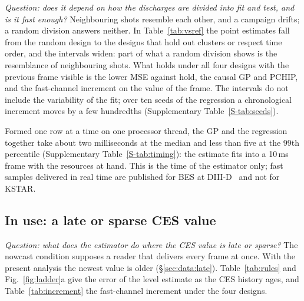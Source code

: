 \documentclass[11pt,a4paper]{article}
\newcommand{\SuppTab}[1]{Supplementary Table~\ref{S-#1}}
\begin{document}
\emph{Question: does it depend on how the discharges are divided into fit and test, and
is it fast enough?} Neighbouring shots resemble each other, and a campaign drifts; a
random division answers neither. In Table~\ref{tab:vsref} the point estimates fall from
the random design to the designs that hold out clusters or respect time order, and the
intervals widen: part of what a random division shows is the resemblance of neighbouring
shots. What holds under all four designs with the previous frame visible is the lower MSE
against hold, the causal GP and PCHIP, and the fast-channel increment on the value of the
frame. The intervals do not include the variability of the fit; over ten seeds of the
regression a chronological increment moves by a few hundredths (\SuppTab{tab:seeds}).

Formed one row at a time on one processor thread, the GP and the regression together take
about two milliseconds at the median and less than five at the 99th percentile
(\SuppTab{tab:timing}): the estimate fits into a 10\,ms frame with the resources at
hand. This is the time of the estimator only; fast samples delivered in real time are
published for BES at DIII-D~\citep{Kim2026RealTimePlasma} and not for KSTAR.

\subsection{In use: a late or sparse CES value}
\label{sec:res:use}

\emph{Question: what does the estimator do where the CES value is late or sparse?} The
nowcast condition supposes a reader that delivers every frame at once. With the present
analysis the newest value is older (\S\ref{sec:data:late}). Table~\ref{tab:rules} and
Fig.~\ref{fig:ladder}a give the error of the level estimate as the CES history ages, and
Table~\ref{tab:increment} the fast-channel increment under the four designs.

\begin{table}[tbp]
  \centering
  \caption{The estimator in use: error of the level estimate by availability rule, KSTAR,
  random design V1, target L5. Upper block: fixed delays on the rows complete under all
  of them (\NCommonRows{} rows, \NCommonDischarges{} discharges, \NCommonClusters{}
  clusters). Lower block: the beam-modulation schedule S, with an analysis time of zero,
  and the previous frame on the same rows (\NSRows{} rows, \NSDischarges{} discharges,
  \NSClusters{} clusters). O is the reading of the frame itself, which does not exist
  before the frame has been analysed. One estimator is fitted per rule. Intervals:
  95\,\%, shot clusters resampled; bold: the interval excludes zero.}
  \label{tab:rules}
  \TabRulesVone
\end{table}
\end{document}

